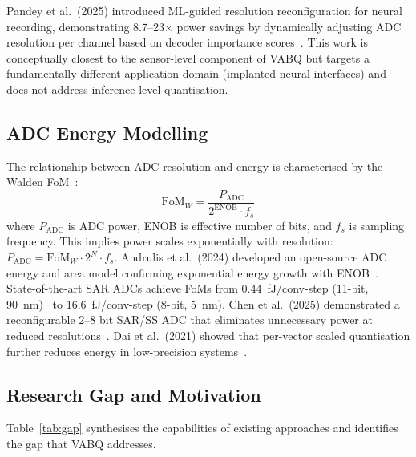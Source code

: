 Pandey et al.~(2025) introduced ML-guided resolution reconfiguration for neural recording, demonstrating 8.7--23$\times$ power savings by dynamically adjusting ADC resolution per channel based on decoder importance scores~\cite{pandey2025neural}. This work is conceptually closest to the sensor-level component of VABQ but targets a fundamentally different application domain (implanted neural interfaces) and does not address inference-level quantisation.

\subsection{ADC Energy Modelling}
\label{sec:rw_adc}

The relationship between ADC resolution and energy is characterised by the Walden FoM~\cite{waldenADC2018}:
\begin{equation}
    \text{FoM}_W = \frac{P_{\text{ADC}}}{2^{\text{ENOB}} \cdot f_s}
    \label{eq:walden}
\end{equation}
where $P_{\text{ADC}}$ is ADC power, ENOB is effective number of bits, and $f_s$ is sampling frequency. This implies power scales exponentially with resolution: $P_{\text{ADC}} = \text{FoM}_W \cdot 2^N \cdot f_s$. Andrulis et al.~(2024) developed an open-source ADC energy and area model confirming exponential energy growth with ENOB~\cite{andrulis2024adc}. State-of-the-art SAR ADCs achieve FoMs from 0.44~fJ/conv-step (11-bit, 90~nm)~\cite{waldenADC2018} to 16.6~fJ/conv-step (8-bit, 5~nm). Chen et al.~(2025) demonstrated a reconfigurable 2--8 bit SAR/SS ADC that eliminates unnecessary power at reduced resolutions~\cite{reconfigADC2025}. Dai et al.~(2021) showed that per-vector scaled quantisation further reduces energy in low-precision systems~\cite{vsquant2021}.

\subsection{Research Gap and Motivation}
\label{sec:rw_gap}

Table~\ref{tab:gap} synthesises the capabilities of existing approaches and identifies the gap that VABQ addresses.


